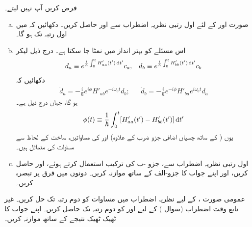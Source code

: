 فرض کریں آپ  نہیں لیتے۔
\begin{enumerate}[a.]
\item
 صورت  اور  کے لئے اول رتبی نظریہ اضطراب سے  اور  حاصل کریں۔ دکھائیں کہ  میں اول رتبہ تک
  ہو گا۔
\item
 اس مسئلے کو بہتر انداز میں نمٹا جا سکتا ہے۔ درج ذیل لیکر
\begin{align}
	d_a\equiv e^{\frac{i}{\hslash}\int_{0}^{t}H'_{aa}(t')\dif t'}c_a,&&d_b\equiv e^{\frac{i}{\hslash}\int_{0}^{t}H'_{bb}(t')\dif t'}c_b
\end{align}
دکھائیں کہ
\begin{align}
	\dot{d}_a=-\frac{i}{\hslash}e^{i\phi}H'_{ab}e^{-i\omega_0t}d_b;&&\dot{d}_b=-\frac{i}{\hslash}e^{-i\phi}H'_{ba}e^{i\omega_0t}d_a
\end{align}
ہو گا، جہاں درج ذیل ہے۔
\begin{align}
	\phi(t)\equiv\frac{1}{\hslash}\int_{0}^{t}[H'_{aa}(t')-H'_{bb}(t')]\dif t'
\end{align}
یوں (  کے ساتھ چسپاں اضافی جزو ضرب  کے علاوہ)  اور  کی مساواتیں، ساخت کے لحاظ سے مساوات  کی متماثل ہیں۔
\item
 اول رتبی نظریہ اضطراب سے، جزو -ب کی ترکیب استعمال کرتے ہوئے،  اور  حاصل کریں، اور اپنے جواب کا جزو-الف کے ساتھ موازنہ کریں۔ دونوں میں فرق پر تبصرہ کریں۔
 \end{enumerate}
عمومی صورت ،  کے لیے نظریہ اضطراب میں مساوات  کو دوم رتبہ تک حل کریں۔
غیر تابع وقت اضطراب (سوال ) کے لیے  اور  کو دوم رتبہ تک حاصل کریں۔ اپنے جواب کا ٹھیک ٹھیک نتیجے کے ساتھ موازنہ کریں۔


